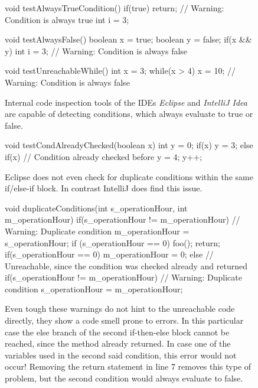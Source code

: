 
\begin{figure}[h!]
	\begin{JavaCode}
void testAlwaysTrueCondition() {
	if(true) return; // Warning: Condition is always true
	int i = 3;
}

void testAlwaysFalse() {
	boolean x = true;
	boolean y = false;
	if(x && y) int i = 3; // Warning: Condition is always false
}

void testUnreachableWhile() {
	int x = 3;
	while(x > 4) x = 10; // Warning: Condition is always false
}\end{JavaCode}
	\caption{Internal code inspection tools of the IDEs \emph{Eclipse} and \emph{IntelliJ Idea} are capable of detecting conditions, which always evaluate to true or false.}
	\label{code:Java eclipse intelij always true or false}
\end{figure}

\begin{figure}
	\begin{JavaCode}
void testCondAlreadyChecked(boolean x) {
	int y = 0;
	if(x) {
		y = 3;
	} else if(x) { // Condition already checked before
		y = 4;
	}
	y++;
}\end{JavaCode}
\caption{Eclipse does not even check for duplicate conditions within the same if/else-if block. In contrast IntelliJ does find this issue.}
\label{code:Java eclipse fail to find this}
\end{figure}

\begin{figure}
	\begin{JavaCode}
void duplicateConditions(int s_operationHour, int m_operationHour) {
	if(s_operationHour != m_operationHour) { // Warning: Duplicate condition
		m_operationHour = s_operationHour;
		if (s_operationHour == 0) {
			foo();        
		}
		return;
	}
	if(s_operationHour == 0) {
		m_operationHour = 0;
	} else {
		// Unreachable, since the condition was checked already and returned
		if(s_operationHour != m_operationHour) { // Warning: Duplicate condition
			s_operationHour = m_operationHour;
		}
	}
}\end{JavaCode}
	\caption{Even tough these warnings do not hint to the unreachable code directly, they show a code smell prone to errors. In this particular case the else branch of the second if-then-else block cannot be reached, since the method already returned. In case one of the variables used in the second said condition, this error would not occur! Removing the return statement in line 7 removes this type of problem, but the second condition would always evaluate to false. }
	\label{code:Java intelij duplicate conditions}
\end{figure}

